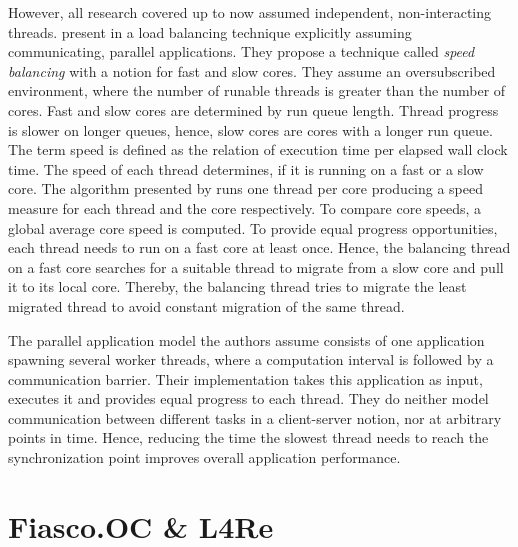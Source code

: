 However, all research covered up to now assumed independent, non-interacting threads.
\citeauthor{hofmeyr_load_2010} present in \cite{hofmeyr_load_2010} a load
balancing technique explicitly assuming communicating, parallel applications.
They propose a technique called \emph{speed balancing} with a notion for fast
and slow cores.
They assume an oversubscribed environment, where the number of runable threads
is greater than the number of cores.
Fast and slow cores are determined by run queue length.
Thread progress is slower on longer queues, hence, slow cores are cores with a
longer run queue.
The term speed is defined as the relation of execution time per elapsed wall
clock time.
The speed of each thread determines, if it is running on a fast or a slow core.
The algorithm presented by \citeauthor{hofmeyr_load_2010} runs one thread per
core producing a speed measure for each thread and the core respectively.
To compare core speeds, a global average core speed is computed.
To provide equal progress opportunities, each thread needs to run on a fast
core at least once.
Hence, the balancing thread on a fast core searches for a suitable thread to
migrate from a slow core and pull it to its local core.
Thereby, the balancing thread tries to migrate the least migrated thread to
avoid constant migration of the same thread.

The parallel application model the authors assume consists of one application
spawning several worker threads, where a computation interval is followed by a
communication barrier.
Their implementation takes this application as input, executes it and provides
equal progress to each thread.
They do neither model communication between different tasks in a client-server
notion, nor at arbitrary points in time.
Hence, reducing the time the slowest thread needs to reach the synchronization
point improves overall application performance.




\section{Fiasco.OC \& L4Re}
\label{state:env}

